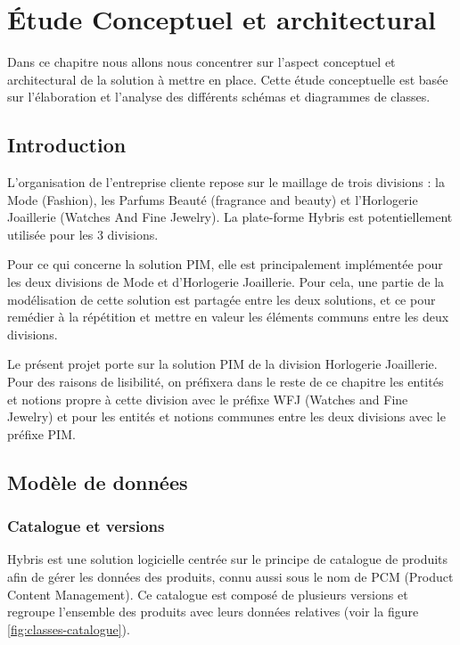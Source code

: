 \chapter{Étude Conceptuel et architectural}
\label{sec:conception}

\begin{fquote}Dans ce chapitre nous allons nous concentrer sur l’aspect conceptuel et architectural de la solution à mettre en place. Cette étude conceptuelle est basée sur l’élaboration et l’analyse des différents schémas et diagrammes de classes.
 \end{fquote}

\clearpage

\section{Introduction}

L'organisation de l'entreprise cliente repose sur le maillage de trois divisions : la Mode (Fashion), les Parfums Beauté (fragrance and beauty) et l'Horlogerie Joaillerie (Watches And Fine Jewelry). La plate-forme Hybris est potentiellement utilisée pour les 3 divisions.

\medskip

Pour ce qui concerne la solution PIM, elle est principalement implémentée pour les deux divisions de Mode et d'Horlogerie Joaillerie. Pour cela, une partie de la modélisation de cette solution est partagée entre les deux solutions, et ce pour remédier à la répétition et mettre en valeur les éléments communs entre les deux divisions.

\medskip

Le présent projet porte sur la solution PIM de la division Horlogerie Joaillerie. Pour des raisons de lisibilité, on préfixera dans le reste de ce chapitre les entités et notions propre à cette division avec le préfixe WFJ (Watches and Fine Jewelry) et pour les entités et notions communes entre les deux divisions avec le préfixe PIM.

\section{Modèle de données}
\subsection{Catalogue et versions}

Hybris est une solution logicielle centrée sur le principe de catalogue de produits afin de gérer les données des produits, connu aussi sous le nom de PCM (Product Content Management). Ce catalogue est composé de plusieurs versions et regroupe l'ensemble des produits avec leurs données relatives (voir la figure \ref{fig:classes-catalogue}).

